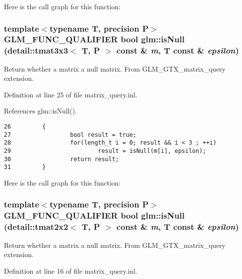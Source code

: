 Here is the call graph for this function:\hypertarget{group__gtx__matrix__query_ge3db03e8b4aea5dc381bc45d1d3935eb}{
\subsubsection[isNull]{\setlength{\rightskip}{0pt plus 5cm}template$<$typename T, precision P$>$ GLM\_\-FUNC\_\-QUALIFIER bool glm::isNull (detail::tmat3x3$<$ T, P $>$ const \& {\em m}, \/  T const \& {\em epsilon})}}
\label{group__gtx__matrix__query_ge3db03e8b4aea5dc381bc45d1d3935eb}


Return whether a matrix a null matrix. From GLM\_\-GTX\_\-matrix\_\-query extension. 

Definition at line 25 of file matrix\_\-query.inl.

References glm::isNull().

\begin{Code}\begin{verbatim}26         {
27                 bool result = true;
28                 for(length_t i = 0; result && i < 3 ; ++i)
29                         result = isNull(m[i], epsilon);
30                 return result;
31         }
\end{verbatim}
\end{Code}




Here is the call graph for this function:\hypertarget{group__gtx__matrix__query_g54401e84073257d2bab8680e207ef405}{
\subsubsection[isNull]{\setlength{\rightskip}{0pt plus 5cm}template$<$typename T, precision P$>$ GLM\_\-FUNC\_\-QUALIFIER bool glm::isNull (detail::tmat2x2$<$ T, P $>$ const \& {\em m}, \/  T const \& {\em epsilon})}}
\label{group__gtx__matrix__query_g54401e84073257d2bab8680e207ef405}


Return whether a matrix a null matrix. From GLM\_\-GTX\_\-matrix\_\-query extension. 

Definition at line 16 of file matrix\_\-query.inl.

